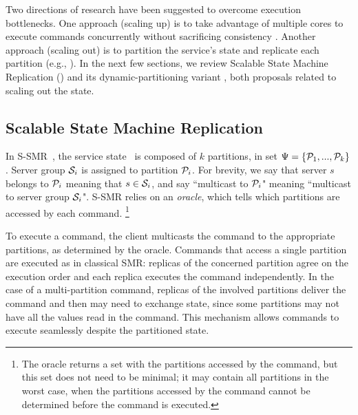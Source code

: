 Two directions of research have been suggested to overcome execution bottlenecks. One approach (scaling up) is to take advantage of multiple cores to execute commands concurrently without sacrificing consistency \cite{Kapritsos:2012um,Marandi:2014bj,Kotla:2004ep,Guo:2014jp}.
Another approach (scaling out) is to partition the service's state and replicate each partition (e.g., \cite{Glendenning:2011kj,Marandi:2011dj}). In the next few sections, we review Scalable State Machine Replication (\ssmr) and its dynamic-partitioning variant \dssmr, both proposals related to scaling out the state.

\subsection{Scalable State Machine Replication}
\label{sec:ssmr}

In S-SMR~\cite{bezerra2014ssmr}, the service state \vvt\ is composed of $k$ partitions, in set $\Psi = \{\mathcal{P}_1, ..., \mathcal{P}_k\}$. Server group $\mathcal{S}_i$ is assigned to partition $\mathcal{P}_i$. For brevity, we say that server $s$ belongs to $\mathcal{P}_i$ meaning that $s \in \mathcal{S}_i$, and say ``multicast to $\mathcal{P}_i$" meaning ``multicast to server group $\mathcal{S}_i$".
S-SMR relies on an \emph{oracle}, which tells which partitions are accessed by each command.%
\footnote{The oracle returns a set with the partitions accessed by the command, but this set does not need to be minimal; it may contain all partitions in the worst case, when the partitions accessed by the command cannot be determined before the command is executed.}

To execute a command, the client multicasts the command to the appropriate partitions, as determined by the oracle.
Commands that access a single partition are executed as in classical SMR: replicas of the concerned partition agree on the execution order and each replica executes the command independently.
In the case of a multi-partition command, replicas of the involved partitions deliver the command and then may need to exchange state, since some partitions may not have all the values read in the command.
This mechanism allows commands to execute seamlessly despite the partitioned state.




